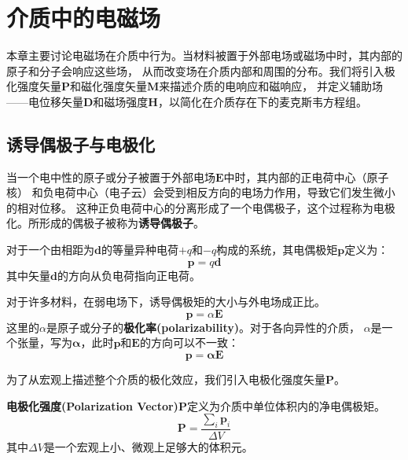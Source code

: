 \documentclass[fontset=none]{ctexart}
\begin{document}
\section{介质中的电磁场}
本章主要讨论电磁场在介质中行为。当材料被置于外部电场或磁场中时，其内部的原子和分子会响应这些场，
从而改变场在介质内部和周围的分布。我们将引入极化强度矢量$\bm{P}$和磁化强度矢量$\bm{M}$来描述介质的电响应和磁响应，
并定义辅助场——电位移矢量$\bm{D}$和磁场强度$\bm{H}$，以简化在介质存在下的麦克斯韦方程组。

\subsection{诱导偶极子与电极化}
当一个电中性的原子或分子被置于外部电场$\bm{E}$中时，其内部的正电荷中心（原子核）
和负电荷中心（电子云）会受到相反方向的电场力作用，导致它们发生微小的相对位移。
这种正负电荷中心的分离形成了一个电偶极子，这个过程称为电极化。所形成的偶极子被称为\textbf{诱导偶极子}。

\begin{definition}[电偶极矩]
    对于一个由相距为$\bm{d}$的等量异种电荷$+q$和$-q$构成的系统，其电偶极矩$\bm{p}$定义为：
    \begin{equation}
        \bm{p} = q\bm{d}
    \end{equation}
    其中矢量$\bm{d}$的方向从负电荷指向正电荷。
\end{definition}

对于许多材料，在弱电场下，诱导偶极矩的大小与外电场成正比。
\begin{equation}
    \bm{p} = \alpha \bm{E}
\end{equation}
这里的$\alpha$是原子或分子的\textbf{极化率(polarizability)}。对于各向异性的介质，
$\alpha$是一个张量，写为$\bm{\alpha}$，此时$\bm{p}$和$\bm{E}$的方向可以不一致：
\begin{equation}
    \bm{p} = \bm{\alpha} \bm{E}
\end{equation}

为了从宏观上描述整个介质的极化效应，我们引入电极化强度矢量$\bm{P}$。
\begin{definition}[电极化强度矢量]
    \textbf{电极化强度(Polarization Vector)}$\bm{P}$定义为介质中单位体积内的净电偶极矩。
    \begin{equation}
        \bm{P} = \frac{\sum_{i} \bm{p}_i}{\Delta V}
    \end{equation}
    其中$\Delta V$是一个宏观上小、微观上足够大的体积元。
\end{definition}
\end{document}
